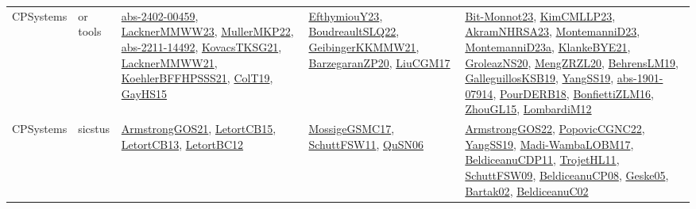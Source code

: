 {\begin{longtable}{lp{3cm}>{\raggedright}p{6cm}>{\raggedright}p{6cm}p{8cm}}
CPSystems & or tools & \href{articles/abs-2402-00459.pdf}{abs-2402-00459}\cite{abs-2402-00459}, \href{articles/LacknerMMWW23.pdf}{LacknerMMWW23}\cite{LacknerMMWW23}, \href{articles/MullerMKP22.pdf}{MullerMKP22}\cite{MullerMKP22}, \href{articles/abs-2211-14492.pdf}{abs-2211-14492}\cite{abs-2211-14492}, \href{papers/KovacsTKSG21.pdf}{KovacsTKSG21}\cite{KovacsTKSG21}, \href{papers/LacknerMMWW21.pdf}{LacknerMMWW21}\cite{LacknerMMWW21}, \href{articles/KoehlerBFFHPSSS21.pdf}{KoehlerBFFHPSSS21}\cite{KoehlerBFFHPSSS21}, \href{papers/ColT19.pdf}{ColT19}\cite{ColT19}, \href{papers/GayHS15.pdf}{GayHS15}\cite{GayHS15} & \href{papers/EfthymiouY23.pdf}{EfthymiouY23}\cite{EfthymiouY23}, \href{papers/BoudreaultSLQ22.pdf}{BoudreaultSLQ22}\cite{BoudreaultSLQ22}, \href{papers/GeibingerKKMMW21.pdf}{GeibingerKKMMW21}\cite{GeibingerKKMMW21}, \href{papers/BarzegaranZP20.pdf}{BarzegaranZP20}\cite{BarzegaranZP20}, \href{papers/LiuCGM17.pdf}{LiuCGM17}\cite{LiuCGM17} & \href{papers/Bit-Monnot23.pdf}{Bit-Monnot23}\cite{Bit-Monnot23}, \href{papers/KimCMLLP23.pdf}{KimCMLLP23}\cite{KimCMLLP23}, \href{articles/AkramNHRSA23.pdf}{AkramNHRSA23}\cite{AkramNHRSA23}, \href{articles/MontemanniD23.pdf}{MontemanniD23}\cite{MontemanniD23}, \href{articles/MontemanniD23a.pdf}{MontemanniD23a}\cite{MontemanniD23a}, \href{papers/KlankeBYE21.pdf}{KlankeBYE21}\cite{KlankeBYE21}, \href{papers/GroleazNS20.pdf}{GroleazNS20}\cite{GroleazNS20}, \href{articles/MengZRZL20.pdf}{MengZRZL20}\cite{MengZRZL20}, \href{papers/BehrensLM19.pdf}{BehrensLM19}\cite{BehrensLM19}, \href{papers/GalleguillosKSB19.pdf}{GalleguillosKSB19}\cite{GalleguillosKSB19}, \href{papers/YangSS19.pdf}{YangSS19}\cite{YangSS19}, \href{articles/abs-1901-07914.pdf}{abs-1901-07914}\cite{abs-1901-07914}, \href{articles/PourDERB18.pdf}{PourDERB18}\cite{PourDERB18}, \href{papers/BonfiettiZLM16.pdf}{BonfiettiZLM16}\cite{BonfiettiZLM16}, \href{papers/ZhouGL15.pdf}{ZhouGL15}\cite{ZhouGL15}, \href{articles/LombardiM12.pdf}{LombardiM12}\cite{LombardiM12}\\
CPSystems & sicstus & \href{papers/ArmstrongGOS21.pdf}{ArmstrongGOS21}\cite{ArmstrongGOS21}, \href{articles/LetortCB15.pdf}{LetortCB15}\cite{LetortCB15}, \href{papers/LetortCB13.pdf}{LetortCB13}\cite{LetortCB13}, \href{papers/LetortBC12.pdf}{LetortBC12}\cite{LetortBC12} & \href{papers/MossigeGSMC17.pdf}{MossigeGSMC17}\cite{MossigeGSMC17}, \href{articles/SchuttFSW11.pdf}{SchuttFSW11}\cite{SchuttFSW11}, \href{papers/QuSN06.pdf}{QuSN06}\cite{QuSN06} & \href{papers/ArmstrongGOS22.pdf}{ArmstrongGOS22}\cite{ArmstrongGOS22}, \href{papers/PopovicCGNC22.pdf}{PopovicCGNC22}\cite{PopovicCGNC22}, \href{papers/YangSS19.pdf}{YangSS19}\cite{YangSS19}, \href{papers/Madi-WambaLOBM17.pdf}{Madi-WambaLOBM17}\cite{Madi-WambaLOBM17}, \href{articles/BeldiceanuCDP11.pdf}{BeldiceanuCDP11}\cite{BeldiceanuCDP11}, \href{articles/TrojetHL11.pdf}{TrojetHL11}\cite{TrojetHL11}, \href{papers/SchuttFSW09.pdf}{SchuttFSW09}\cite{SchuttFSW09}, \href{papers/BeldiceanuCP08.pdf}{BeldiceanuCP08}\cite{BeldiceanuCP08}, \href{papers/Geske05.pdf}{Geske05}\cite{Geske05}, \href{papers/Bartak02.pdf}{Bartak02}\cite{Bartak02}, \href{papers/BeldiceanuC02.pdf}{BeldiceanuC02}\cite{BeldiceanuC02}\\

\end{longtable}}
